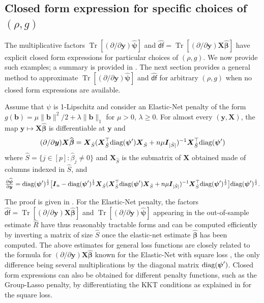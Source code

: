 \documentclass[11pt]{amsart}
\numberwithin{equation}{section}
\numberwithin{equation}{section}
\def\diag{\hbox{\rm diag}}
\DeclareMathOperator{\trace}{Tr}
\def\mathbold{\boldsymbol} %
\def\bb{\mathbold{b}}\def\bhat{\widehat{b}}\def\btil{\widetilde{b}}
\def\bI{\mathbold{I}}\def\hbI{{\widehat{\bI}}}\def\tbI{{\widetilde{\bI}}}
\def\bX{\mathbold{X}}\def\hbX{{\widehat{\bX}}}\def\tbX{{\widetilde{\bX}}}\def\bXbar{{\overline \bX}}
\def\by{\mathbold{y}}\def\yhat{\widehat{y}}\def\ytil{\widetilde{y}}\def\ybar{{\overline y}}\def\vby{{\bf y}}
\def\bbeta{\mathbold{\beta}}\def\betahat{\widehat{\beta}}\def\hbeta{\widehat{\beta}}
\def\hbbeta{{{\widehat{\bbeta}}}}
\def\bpsi{\mathbold{\psi}}\def\psihat{\widehat{\psi}}\def\hpsi{\widehat{\psi}}
\def\hbpsi{{\widehat{\bpsi}}}\def\tbpsi{{\widetilde{\bpsi}}}
\def\df{{\hat{\mathsf{df}}}{}}
\newcommand\pb[1]{{ #1 }}
\begin{document}
\subsection{Closed form expression for specific choices of $(\rho,g)$}
The multiplicative factors
$\trace[ (\partial/\partial \by)\hbpsi]$
and
$\df = \trace[(\partial/\partial \by)\bX\hbbeta]$
have explicit closed form expressions for particular 
choices of $(\rho,g)$. We now provide such examples;
a summary is provided in .
The next section provides a general method to approximate
$\trace[ (\partial/\partial \by)\hbpsi]$ and $\df$
for arbitrary $(\rho,g)$ when no closed form
expressions are available.

\begin{proposition}
    \label{prop:specific-ENet}
Assume that $\psi$ is 1-Lipschitz and 
consider an Elastic-Net penalty of the form $g(\bb) = \mu \|\bb\|^2/2 + \lambda \|\bb\|_1$
for $\mu>0$, $\lambda\ge 0$.
For almost every $(\by,\bX)$,
the map $\by\mapsto\bX\hbbeta$ is differentiable at $\by$ and
\begin{equation}
(\partial/{\partial \by}) \bX\hbbeta
= \bX_{\hat S} (\bX_{\hat S}^\top\diag(\bpsi')\bX_{\hat S} + \pb{n}\mu \bI_{|\hat S|} )^{-1}
\bX_{\hat S}^\top\diag(\bpsi') 
\label{eq:df-Elastic-Net}
\end{equation}
where $\hat S = \{j\in[p]: \hbeta_j\ne 0\}$
and $\bX_{\hat S}$ is the submatrix of $\bX$ obtained made of columns indexed
in $\hat S$, and
\begin{equation}
\label{eq:trace-V-Elastic-Net}
\tfrac{\partial\hbpsi}{\partial\by}
= \diag(\bpsi')^{\frac12}\bigl[\bI_n - \diag(\bpsi')^{\frac12}\bX_{\hat S} (\bX_{\hat S}^\top\diag(\bpsi')\bX_{\hat S} + \pb{n}\mu \bI_{|\hat S|} )^{-1}
\bX_{\hat S}^\top\diag(\bpsi')^{\frac12}\bigr]\diag(\bpsi')^{\frac12}.
\end{equation}
\end{proposition}
The proof is given in .
For the Elastic-Net penalty,
the factors $
\df = \trace [(\partial/\partial \by) \bX\hbbeta]$ and $
\trace [ (\partial / \partial \by )\hbpsi ]$
appearing in the out-of-sample estimate
$\hat R$ have thus reasonably tractable forms and can be computed efficiently
by inverting a matrix of size $\hat S$ once the elastic-net
estimate $\hbbeta$ has been computed.
The above estimates for general loss functions
are closely related to the formula
for
$(\partial/\partial \by)\bX\hbbeta$ known for the Elastic-Net
with square loss
\cite[Equation (28)]{tibshirani2012}
\cite[Section 3.5.3]{bellec_zhang2018second_stein},
the only difference being several multiplications by the diagonal matrix $\diag(\bpsi')$.
Closed form expressions can also be obtained for different penalty
functions, such as the Group-Lasso penalty, by differentiating the KKT
conditions as explained in
\cite{bellec_zhang2019second_poincare} for the square loss.
\end{document}
